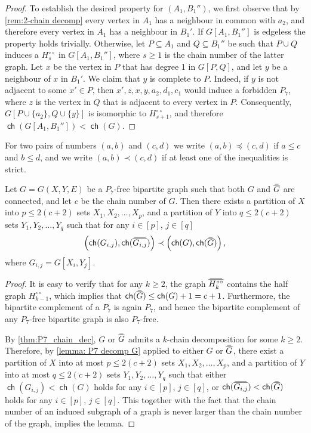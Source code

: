 \documentclass{article}
\newcommand\doverline[1]{%
  \setbox0=\hbox{$\!\overline{#1}\!$}%
  \ht0=\dimexpr\ht0-.2ex\relax%
  \,\overline{\copy0}\,%
}
\newcommand{\bc}[1]{\doverline{#1}} %
\DeclareMathOperator\ch{\mathsf{ch}}
\begin{document}
\begin{proof}
	To establish the desired property for $(A_1, B_1'')$, we first observe that by \cref{rem:2-chain decomp}
	every vertex in $A_1$ has a neighbour in common with $a_2$, and therefore every vertex in $A_1$ has
	a neighbour in $B_1'$. If $G[A_1, B_1'']$ is edgeless the property holds trivially. 
	Otherwise, let $P \subseteq A_1$ and $Q \subseteq B_1''$ be such that $P \cup Q$ induces a 
	$H^{\circ\circ}_s$ in $G[A_1, B_1'']$, where $s \geq 1$ is the chain number of the latter graph.
	Let $x$ be the vertex in $P$ that has degree 1 in $G[P,Q]$, and let $y$ be a neighbour of $x$ in $B_1'$.
	We claim that $y$ is complete to $P$. Indeed, if $y$ is not adjacent to some $x' \in P$, then
	$x', z, x, y, a_2, d_1, c_1$ would induce a forbidden $P_7$, where $z$ is the vertex in $Q$ that is adjacent
	to every vertex in $P$.
	Consequently, $G[P \cup \{ a_2 \}, Q \cup \{ y \}]$ is isomorphic to $H^{\circ\circ}_{s+1}$, and therefore $\ch(G[A_1, B_1'']) < \ch(G)$.
\end{proof}

For two pairs of numbers $(a,b)$ and $(c,d)$ we write $(a,b) \preceq (c,d)$
if $a \leq c$ and $b \leq d$, and we write $(a,b) \prec (c,d)$ if at least one of the
inequalities is strict.
  
\begin{lemma}
	\label{lemma: P7 decomp GcoG}
	Let $G=G(X,Y,E)$ be a $P_7$-free bipartite graph such that both $G$ and $\bc{G}$ are connected, and
	let $c$ be the chain number of $G$. Then there exists 
	a partition of $X$ into $p \leq 2(c+2)$ sets $X_1, X_2, \ldots, X_p$, and
	a partition of $Y$ into $q \leq 2(c+2)$ sets $Y_1, Y_2, \ldots, Y_q$ such that
	for any $i \in[p]$, $j \in [q]$
	$$
		\left( \ch(G_{i,j}), \ch(\bc{G_{i,j}}) \right) \prec  \left( \ch(G), \ch(\bc{G}) \right),
	$$
	where $G_{i,j} = G[X_i, Y_j]$.
\end{lemma}
\begin{proof}
	It is easy to verify that for any $k \geq 2$, the graph $\bc{H^{\circ\circ}_k}$ contains the half graph $H^{\circ\circ}_{k-1}$, which implies that 
	$\ch(\bc{G}) \leq \ch(G) + 1 = c + 1$. Furthermore, the bipartite complement of a $P_7$ is again $P_7$, 
	and hence the bipartite complement of any $P_7$-free bipartite graph is also $P_7$-free.
	
	By \cref{thm:P7_chain_dec}, $G$ or $\bc{G}$ admits a $k$-chain decomposition for some $k \geq 2$.
	Therefore, by \cref{lemma: P7 decomp G} applied to either $G$ or $\bc{G}$, there exist
	a partition of $X$ into at most $p \leq 2(c+2)$ sets $X_1, X_2, \ldots, X_p$, and
	a partition of $Y$ into at most $q \leq 2(c+2)$ sets $Y_1, Y_2, \ldots, Y_q$ such that
	either $\ch(G_{i,j}) <  \ch(G)$ holds for any $i \in[p]$, $j \in [q]$,
	or $\ch(\bc{G_{i,j}}) <  \ch(\bc{G})$ holds for any $i \in[p]$, $j \in [q]$.
	This together with the fact that the chain number of an induced subgraph 
	of a graph is never larger than the chain number of the graph, implies the lemma.
\end{proof}
\end{document}
